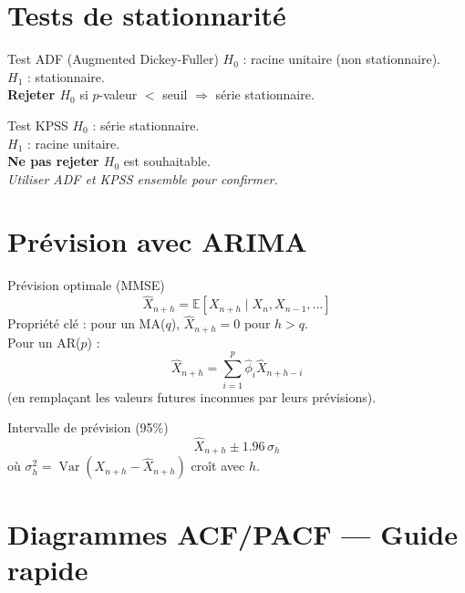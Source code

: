 \documentclass[10pt,a4paper,twocolumn]{article}
\newcommand{\E}{\mathbb{E}}
\newcommand{\Var}{\operatorname{Var}}
\begin{document}
\section{Tests de stationnarité}

\begin{defbox}{Test ADF (Augmented Dickey-Fuller)}
$H_0$ : racine unitaire (non stationnaire).\\
$H_1$ : stationnaire.\\
\textbf{Rejeter $H_0$} si $p$-valeur $<$ seuil $\Rightarrow$ série stationnaire.
\end{defbox}

\begin{defbox}{Test KPSS}
$H_0$ : série stationnaire.\\
$H_1$ : racine unitaire.\\
\textbf{Ne pas rejeter $H_0$} est souhaitable.\\
\textit{Utiliser ADF et KPSS ensemble pour confirmer.}
\end{defbox}

\section{Prévision avec ARIMA}

\begin{formulebox}{Prévision optimale (MMSE)}
\[
\hat{X}_{n+h} = \E[X_{n+h} \mid X_n, X_{n-1}, \ldots]
\]
Propriété clé : pour un MA($q$), $\hat{X}_{n+h} = 0$ pour $h > q$.\\
Pour un AR($p$) :
\[
\hat{X}_{n+h} = \sum_{i=1}^p \hat{\phi}_i \hat{X}_{n+h-i}
\]
(en remplaçant les valeurs futures inconnues par leurs prévisions).
\end{formulebox}

\begin{formulebox}{Intervalle de prévision (95\%)}
\[
\hat{X}_{n+h} \pm 1.96\,\sigma_h
\]
où $\sigma_h^2 = \Var(X_{n+h} - \hat{X}_{n+h})$ croît avec $h$.
\end{formulebox}

\section{Diagrammes ACF/PACF — Guide rapide}
\end{document}
